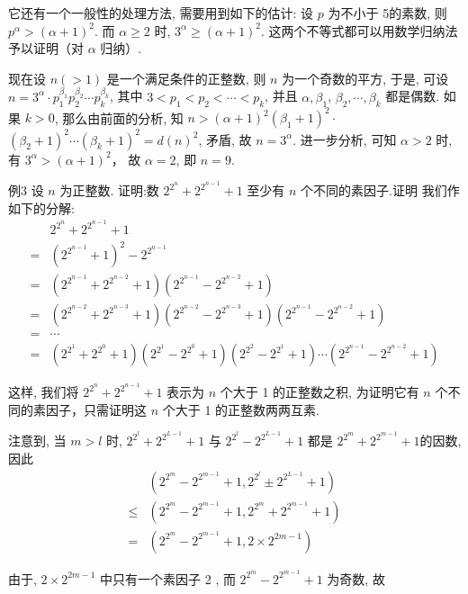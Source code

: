 它还有一个一般性的处理方法, 需要用到如下的估计: 设 $p$ 为不小于 5的素数, 则 $p^{\alpha}>(\alpha+1)^{2}$. 而 $\alpha \geqslant 2$ 时, $3^{\alpha} \geqslant(\alpha+1)^{2}$. 这两个不等式都可以用数学归纳法予以证明（对 $\alpha$ 归纳）. 

现在设 $n(>1)$ 是一个满足条件的正整数, 则 $n$ 为一个奇数的平方, 于是, 可设 $n=3^{\alpha} \cdot p_{1}^{\beta_{1}} p_{2}^{\beta_{2}} \cdots p_{k}^{\beta_{k}}$, 其中 $3<p_{1}<p_{2}<\cdots<p_{k}$, 并且 $\alpha, \beta_{1}$, $\beta_{2}, \cdots, \beta_{k}$ 都是偶数. 如果 $k>0$, 那么由前面的分析, 知 $n>(\alpha+1)^{2}\left(\beta_{1}+1\right)^{2} \cdot$ $\left(\beta_{2}+1\right)^{2} \cdots\left(\beta_{k}+1\right)^{2}=d(n)^{2}$, 矛盾, 故 $n=3^{\alpha}$. 进一步分析, 可知 $\alpha>2$ 时, 有 $3^{\alpha}>(\alpha+1)^{2} ，$ 故 $\alpha=2$, 即 $n=9$.

例3 设 $n$ 为正整数. 证明:数 $2^{2^{n}}+2^{2^{n-1}}+1$ 至少有 $n$ 个不同的素因子.证明 我们作如下的分解:\\
\begin{align}
& 2^{2^{n}}+2^{2^{n-1}}+1 \\
= & \left(2^{2^{n-1}}+1\right)^{2}-2^{2^{n-1}} \\
= & \left(2^{2^{n-1}}+2^{2^{n-2}}+1\right)\left(2^{2^{n-1}}-2^{2^{n-2}}+1\right) \\
= & \left(2^{2^{n-2}}+2^{2^{n-3}}+1\right)\left(2^{2^{n-2}}-2^{2^{n-3}}+1\right)\left(2^{2^{n-1}}-2^{2^{n-2}}+1\right) \\
= & \cdots \\
= & \left(2^{2^{1}}+2^{2^{0}}+1\right)\left(2^{2^{1}}-2^{2^{0}}+1\right)\left(2^{2^{2}}-2^{2^{1}}+1\right) \cdots\left(2^{2^{n-1}}-2^{2^{n-2}}+1\right)
\end{align}

这样, 我们将 $2^{2^{n}}+2^{2^{n-1}}+1$ 表示为 $n$ 个大于 1 的正整数之积, 为证明它有 $n$ 个不同的素因子，只需证明这 $n$ 个大于 1 的正整数两两互素. 

注意到, 当 $m>l$ 时, $2^{2^{l}}+2^{2^{L-1}}+1$ 与 $2^{2^{l}}-2^{2^{L-1}}+1$ 都是 $2^{2^{m}}+2^{2^{m-1}}+1$的因数, 因此\\
\begin{align}
& \left(2^{2^{m}}-2^{2^{m-1}}+1,2^{2^{l}} \pm 2^{2^{L-1}}+1\right) \\
\leqslant & \left(2^{2^{m}}-2^{2^{m-1}}+1,2^{2^{m}}+2^{2^{m-1}}+1\right) \\
= & \left(2^{2^{m}}-2^{2^{m-1}}+1,2 \times 2^{2 m-1}\right)
\end{align}

由于, $2 \times 2^{2 m-1}$ 中只有一个素因子 2 , 而 $2^{2^{m}}-2^{2^{m-1}}+1$ 为奇数, 故

